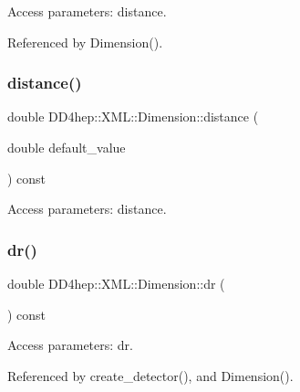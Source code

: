 Access parameters\+: distance. 



Referenced by Dimension().

\hypertarget{struct_d_d4hep_1_1_x_m_l_1_1_dimension_a61efc93a10d69420d0606c36ab6318cb}{}\label{struct_d_d4hep_1_1_x_m_l_1_1_dimension_a61efc93a10d69420d0606c36ab6318cb} 
\subsubsection{\texorpdfstring{distance()}{distance()}\hspace{0.1cm}{\footnotesize\ttfamily [2/2]}}
{\footnotesize\ttfamily double D\+D4hep\+::\+X\+M\+L\+::\+Dimension\+::distance (\begin{DoxyParamCaption}\item[{double}]{default\+\_\+value }\end{DoxyParamCaption}) const}



Access parameters\+: distance. 

\hypertarget{struct_d_d4hep_1_1_x_m_l_1_1_dimension_ab7b4ce1baea4500c995b0cd954081067}{}\label{struct_d_d4hep_1_1_x_m_l_1_1_dimension_ab7b4ce1baea4500c995b0cd954081067} 
\subsubsection{\texorpdfstring{dr()}{dr()}\hspace{0.1cm}{\footnotesize\ttfamily [1/2]}}
{\footnotesize\ttfamily double D\+D4hep\+::\+X\+M\+L\+::\+Dimension\+::dr (\begin{DoxyParamCaption}{ }\end{DoxyParamCaption}) const}



Access parameters\+: dr. 



Referenced by create\+\_\+detector(), and Dimension().

\hypertarget{struct_d_d4hep_1_1_x_m_l_1_1_dimension_af1d458915c4ccbb4862a4abc8368207a}{}\label{struct_d_d4hep_1_1_x_m_l_1_1_dimension_af1d458915c4ccbb4862a4abc8368207a} 
